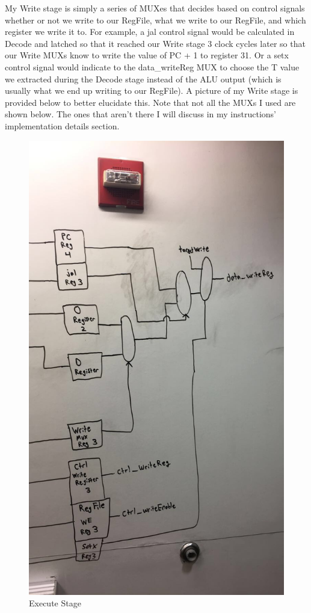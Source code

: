 \documentclass[letterpaper]{article} %
\begin{document}
    My Write stage is simply a series of MUXes that decides based on control signals whether or not we write to our RegFile, what we write to our RegFile, and which register we write it to. For example, a jal control signal would be calculated in Decode and latched so that it reached our Write stage 3 clock cycles later so that our Write MUXs know to write the value of PC + 1 to register 31. Or a setx control signal would indicate to the data\_writeReg MUX to choose the T value we extracted during the Decode stage instead of the ALU output (which is usually what we end up writing to our RegFile). A picture of my Write stage is provided below to better elucidate this. Note that not all the MUXs I used are shown below. The ones that aren't there I will discuss in my instructions' implementation details section. \\
    
                   \FloatBarrier

  \begin{figure}[!htb]
        \includegraphics[scale=.45]{Write.jpg}
        \caption{Execute Stage}
        \label{fig:2}
    \end{figure}
    
\end{document}
